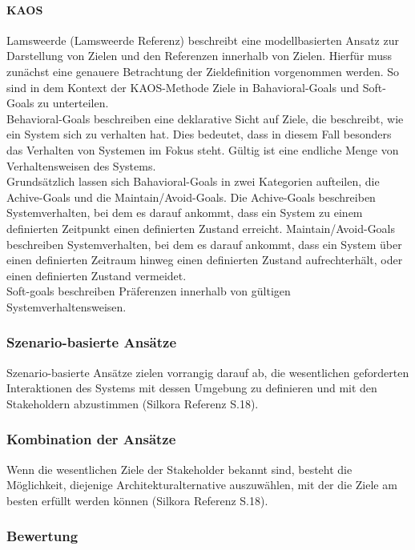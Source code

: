 \paragraph{KAOS}
Lamsweerde (Lamsweerde Referenz) beschreibt eine modellbasierten Ansatz zur Darstellung von Zielen und den Referenzen innerhalb von Zielen. Hierfür muss zunächst eine genauere Betrachtung der Zieldefinition vorgenommen werden. So sind in dem Kontext der KAOS-Methode Ziele in Bahavioral-Goals und Soft-Goals zu unterteilen. \\
Behavioral-Goals beschreiben eine deklarative Sicht auf Ziele, die beschreibt, wie ein System sich zu verhalten hat. Dies bedeutet, dass in diesem Fall besonders das Verhalten von Systemen im Fokus steht. Gültig ist eine endliche Menge von Verhaltensweisen des Systems. \\
Grundsätzlich lassen sich Bahavioral-Goals in zwei Kategorien aufteilen, die Achive-Goals und die Maintain/Avoid-Goals. Die Achive-Goals beschreiben Systemverhalten, bei dem es darauf ankommt, dass ein System zu einem definierten Zeitpunkt einen definierten Zustand erreicht. Maintain/Avoid-Goals beschreiben Systemverhalten, bei dem es darauf ankommt, dass ein System über einen definierten Zeitraum hinweg einen definierten Zustand aufrechterhält, oder einen definierten Zustand vermeidet.\\
Soft-goals beschreiben Präferenzen innerhalb von gültigen Systemverhaltensweisen.
\subsubsection{Szenario-basierte Ansätze}
Szenario-basierte Ansätze zielen vorrangig darauf ab, die wesentlichen geforderten Interaktionen des Systems mit dessen Umgebung zu definieren und mit den Stakeholdern abzustimmen (Silkora Referenz S.18).
\subsubsection{Kombination der Ansätze}
Wenn die wesentlichen Ziele der Stakeholder bekannt sind, besteht die Möglichkeit, diejenige Architekturalternative auszuwählen, mit der die Ziele am besten erfüllt werden können (Silkora Referenz S.18).
\subsubsection{Bewertung}
